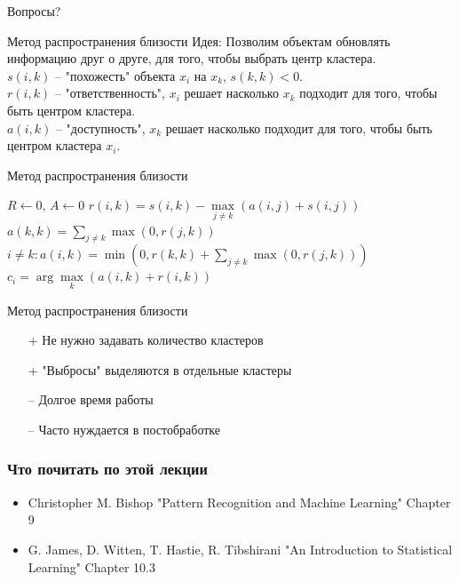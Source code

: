 \documentclass[10pt]{beamer}
\begin{document}
\begin{frame}[standout]
  Вопросы?
\end{frame}

\appendix

{
\begin{frame}{Метод распространения близости}
  \alert{Идея}: Позволим объектам обновлять информацию друг о друге, для того, чтобы выбрать центр кластера.\\
  \pause
  \bigbreak
  $s(i, k)$ -- "похожесть" объекта $x_i$ на $x_k$, $s(k, k) < 0$.\\
  $r(i, k)$ -- "ответственность", $x_i$ решает насколько $x_k$ подходит для того, чтобы быть центром кластера.\\
  $a(i,k)$ -- "доступность", $x_k$ решает насколько подходит для того, чтобы быть центром кластера $x_i$.\\
  \bigbreak
\end{frame}
}

\begin{frame}{Метод распространения близости}
	\begin{algorithmic}[1]
            \State $R \gets 0$, $A \gets 0$            
                \State $r(i, k) = s(i,k) - \max\limits_{j \neq k} (a(i,j) + s(i,j))$
                \State $a(k,k) = \sum\limits_{j \neq k} \max(0, r(j,k))$
                \State $i \neq k: a(i,k) = \min(0, r(k,k) + \sum\limits_{j \neq k} \max(0, r(j,k)))$
                \State $c_i = \arg\max\limits_{k} (a(i,k) + r(i,k))$                
             \EndRepeat
        \EndFunction
  \end{algorithmic}    
\end{frame}

\begin{frame}{Метод распространения близости}
  \begin{enumerate}[<+- | alert@+>]
    \item[+] Не нужно задавать количество кластеров
    \item[+] "Выбросы" выделяются в отдельные кластеры
    \bigbreak
    \item[--] Долгое время работы
    \item[--] Часто нуждается в постобработке
  \end{enumerate}
\end{frame}

\begin{frame}\frametitle{Что почитать по этой лекции}
  \begin{itemize}
    \item Christopher M. Bishop "Pattern Recognition and Machine Learning" Chapter 9
    \item G. James, D. Witten, T. Hastie, R. Tibshirani "An Introduction to Statistical Learning" Chapter 10.3
  \end{itemize}
\end{frame}
\end{document}
